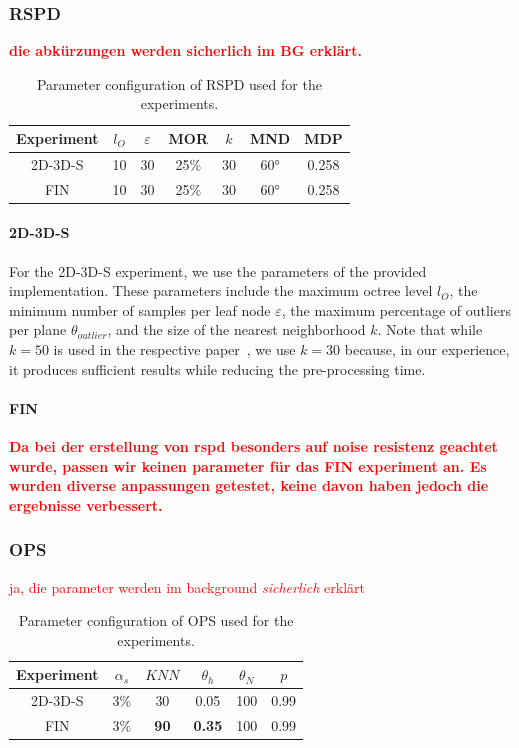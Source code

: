 \documentclass[main.tex]{subfiles}
\begin{document}
\subsubsection{RSPD}
\textbf{\textcolor{red}{die abkürzungen werden sicherlich im BG erklärt.}}
\begin{table}[H]
    \centering
    \begin{tabular}{c|cccccc}
        Experiment & $l_O$ & $\varepsilon$ & MOR  & $k$ & MND & MDP   \\ \hline
        2D-3D-S    & 10    & 30            & 25\% & 30  & 60° & 0.258 \\
        FIN        & 10    & 30            & 25\% & 30  & 60° & 0.258
    \end{tabular}%
    \caption{Parameter configuration of RSPD used for the experiments.}
    \label{tab:rspd-param}
\end{table}

\paragraph{2D-3D-S}
For the 2D-3D-S experiment, we use the parameters of the provided implementation. These parameters include the maximum octree level $l_O$,
the minimum number of samples per leaf node $\varepsilon$, the maximum percentage of outliers per plane $\theta_{outlier}$, and
the size of the nearest neighborhood $k$. Note that while $k=50$ is used in the respective paper~\cite[Section~3.3]{Araújo_Oliveira_2020},
we use $k=30$ because, in our experience, it produces sufficient results while reducing the pre-processing time.

\paragraph{FIN}
\textbf{\textcolor{red}{Da bei der erstellung von rspd besonders auf noise resistenz geachtet wurde, passen wir keinen parameter für
        das FIN experiment an.
        Es wurden diverse anpassungen getestet, keine davon haben jedoch die ergebnisse verbessert.}}
\subsubsection{OPS}

\textcolor{red}{ja, die parameter werden im background \textit{sicherlich} erklärt}
\begin{table}[H]
    \centering
    \begin{tabular}{c|ccccc}
        Experiment & $\alpha_s$ & $KNN$       & $\theta_{h}$  & $\theta_{N}$ & $p$  \\ \hline
        2D-3D-S    & 3\%        & 30          & 0.05          & 100          & 0.99 \\
        FIN        & 3\%        & \textbf{90} & \textbf{0.35} & 100          & 0.99
    \end{tabular}%
    \caption{Parameter configuration of OPS used for the experiments.}
    \label{tab:ops-param}
\end{table}
\end{document}

